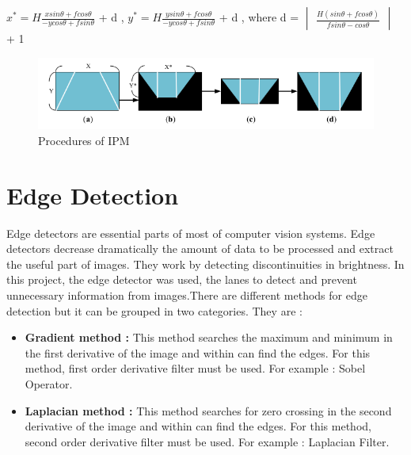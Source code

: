 \begin{center}
 $x^* = H \frac{x sin \theta + f cos \theta}{-y cos \theta + f sin \theta}$ + d ,
 $y^* = H \frac{y sin \theta + f cos \theta}{-y cos \theta + f sin \theta}$ + d ,
 where d = 
 $\begin{vmatrix}
 \frac{H(sin \theta + f cos \theta)}{f sin \theta - cos \theta}
 \end{vmatrix}$ + 1
\end{center}

\begin{figure}[H]
	\centering
	\hspace*{0cm}   
	\includegraphics[width=170mm,scale=1]{./Bilder/Procedures_of_IPM.png}
	\caption{Procedures of IPM \cite{IPM}}
\end{figure}

%
\section{Edge Detection}\label{sec:Edge Detection}
%
Edge detectors are essential parts of most of computer vision systems. Edge detectors decrease dramatically the 
amount of data to be processed and extract the useful part of images. They work by detecting discontinuities in 
brightness.  In this project, the edge detector was used, the lanes to detect and prevent unnecessary information 
from images.There are different methods for edge detection but it can be grouped in two categories. They are :



\begin{itemize}

\item \textbf{Gradient method : } This method searches the maximum and minimum in the first derivative of the image 
and within can find the edges. For this method, first order derivative filter must be used. For example : Sobel 
Operator.
 
\item \textbf{Laplacian method : } This method searches for zero crossing in the second derivative of the image 
and within can find the edges. For this method, second order derivative filter must be used. For example : 
Laplacian Filter.
  
 \end{itemize}
 
